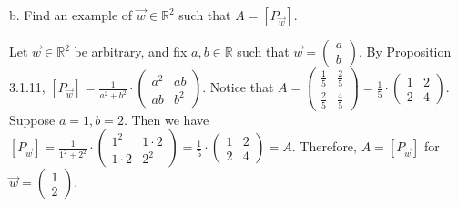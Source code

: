 \documentclass[12pt]{article}
\newenvironment{problem}[2][Problem]
{
	\begin{trivlist} 
		\item[\hskip \labelsep {\bfseries #1 #2:}]
	}
{
	\end{trivlist}
	}
\newenvironment{solution}[1][Solution]
{
	\begin{trivlist} 
		\item[\hskip \labelsep {\itshape #1:}]
	}
	{
	\end{trivlist}
}
\begin{document}
\begin{problem}{2}
\begin{solution}
\end{solution}

\noindent
\newline
\newline
b. Find an example of $\vec{w} \in \mathbb{R}^2$ such that $A=[P_{\vec{w}}]$.
\begin{solution}
Let $\vec{w} \in \mathbb{R}^2$ be arbitrary, and fix $a,b \in \mathbb{R}$ such that $\vec{w} = \begin{pmatrix} a\\b\end{pmatrix}$. By Proposition 3.1.11, $[P_{\vec{w}}]=\frac{1}{a^2 + b^2} \cdot \begin{pmatrix} a^2 &ab \\ ab & b^2 \end{pmatrix}$. Notice that $A = \begin{pmatrix} \frac{1}{5}&\frac{2}{5} \\ \frac{2}{5} &\frac{4}{5}\end{pmatrix} = \frac{1}{5} \cdot \begin{pmatrix}1 & 2 \\ 2 &4\end{pmatrix}$. Suppose $a = 1, b = 2$. Then we have $[P_{\vec{w}}]=\frac{1}{1^2 + 2^2} \cdot \begin{pmatrix} 1^2 &1 \cdot 2 \\ 1\cdot 2 & 2^2 \end{pmatrix} = \frac{1}{5} \cdot \begin{pmatrix} 1 & 2 \\ 2 & 4 \end{pmatrix} = A$. Therefore, $A=[P_{\vec{w}}]$ for $\vec{w} = \begin{pmatrix} 1\\2\end{pmatrix}$.
\end{solution}


\end{problem}
\end{document}
